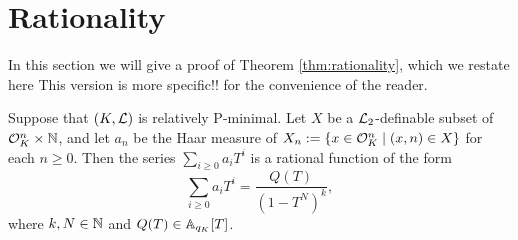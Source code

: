 \section{Rationality}
In this section we will give a proof of Theorem \ref{thm:rationality}, which we restate here {\color{red} This version is more specific!!} for the convenience of the reader.
\begin{thm*}
Suppose that $(K,\cL)$ is relatively P-minimal. Let $X$ be a $\cL_2$-definable subset of $\cO_K^n\times \NN$, and let $a_n$ be the Haar measure of $X_n:=\{x\in \cO_K^n\mid (x,n)\in X\}$ for each $n\geq 0$. Then the series $\sum_{i\geq 0} a_i T^i$ is a rational function of the form
\[\sum_{i\geq 0} a_i T^i = \frac{Q(T) }{(1-T^N)^k},\]
where $k, N \in \N$ and  $Q(T) \in \AA_{q_K}[T]$. 
\end{thm*}
